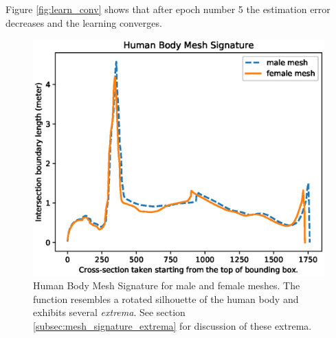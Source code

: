 \documentclass[runningheads, orivec]{llncs}
\begin{document}
Figure \ref{fig:learn_conv} shows that after epoch number 5 the estimation 
error decreases and the learning converges.

\begin{figure}[H]
	\begin{center}
		\includegraphics[width=\linewidth]{Figure_1.eps}
	\end{center}
	\caption{Human Body Mesh Signature for male and female meshes. The 
		function resembles a rotated silhouette of the human body and exhibits 
		several \textit{extrema}. See section 
		\ref{subsec:mesh_signature_extrema} for discussion of these extrema.}
	\label{fig:qualitative_eval}
\end{figure}
\end{document}
